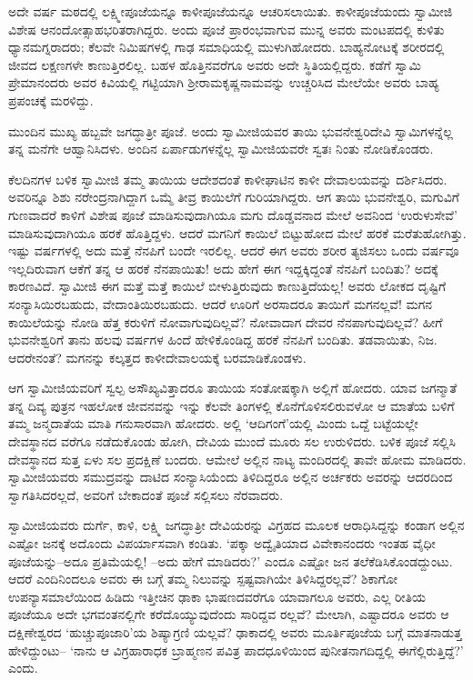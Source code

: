 ಅದೇ ವರ್ಷ ಮಠದಲ್ಲಿ ಲಕ್ಷ್ಮೀಪೂಜೆಯನ್ನೂ ಕಾಳೀಪೂಜೆಯನ್ನೂ ಆಚರಿಸಲಾಯಿತು. ಕಾಳೀಪೂಜೆಯಂದು ಸ್ವಾಮೀಜಿ ವಿಶೇಷ ಆನಂದೋತ್ಸಾಹಭರಿತರಾಗಿದ್ದರು. ಅಂದು ಪೂಜೆ ಪ್ರಾರಂಭವಾಗುವ ಮುನ್ನ ಅವರು ಮಂಟಪದಲ್ಲಿ ಕುಳಿತು ಧ್ಯಾನಮಗ್ನರಾದರು; ಕೆಲವೇ ನಿಮಿಷಗಳಲ್ಲಿ ಗಾಢ ಸಮಾಧಿಯಲ್ಲಿ ಮುಳುಗಿಹೋದರು. ಬಾಹ್ಯನೋಟಕ್ಕೆ ಶರೀರದಲ್ಲಿ ಜೀವದ ಲಕ್ಷಣಗಳೇ ಕಾಣುತ್ತಿರಲಿಲ್ಲ. ಬಹಳ ಹೊತ್ತಿನವರೆಗೂ ಅವರು ಅದೇ ಸ್ಥಿತಿಯಲ್ಲಿದ್ದರು. ಕಡೆಗೆ ಸ್ವಾಮಿ ಪ್ರೇಮಾನಂದರು ಅವರ ಕಿವಿಯಲ್ಲಿ ಗಟ್ಟಿಯಾಗಿ ಶ್ರೀರಾಮಕೃಷ್ಣನಾಮವನ್ನು ಉಚ್ಚರಿಸಿದ ಮೇಲೆಯೇ ಅವರು ಬಾಹ್ಯ ಪ್ರಪಂಚಕ್ಕೆ ಮರಳಿದ್ದು.

ಮುಂದಿನ ಮುಖ್ಯ ಹಬ್ಬವೇ ಜಗದ್ಧಾತ್ರೀ ಪೂಜೆ. ಅಂದು ಸ್ವಾಮೀಜಿಯವರ ತಾಯಿ ಭುವನೇಶ್ವರಿದೇವಿ ಸ್ವಾಮಿಗಳನ್ನೆಲ್ಲ ತನ್ನ ಮನೆಗೇ ಆಹ್ವಾನಿಸಿದಳು. ಅಂದಿನ ಏರ್ಪಾಡುಗಳನ್ನೆಲ್ಲ ಸ್ವಾಮೀಜಿಯವರೇ ಸ್ವತಃ ನಿಂತು ನೋಡಿಕೊಂಡರು.

ಕೆಲದಿನಗಳ ಬಳಿಕ ಸ್ವಾಮೀಜಿ ತಮ್ಮ ತಾಯಿಯ ಆದೇಶದಂತೆ ಕಾಳೀಘಾಟಿನ ಕಾಳೀ ದೇವಾಲಯವನ್ನು ದರ್ಶಿಸಿದರು. ಅವರಿನ್ನೂ ಶಿಶು ನರೇಂದ್ರನಾಗಿದ್ದಾಗ ಒಮ್ಮೆ ತೀವ್ರ ಕಾಯಿಲೆಗೆ ಗುರಿಯಾಗಿದ್ದರು. ಆಗ ತಾಯಿ ಭುವನೇಶ್ವರಿ, ಮಗುವಿಗೆ ಗುಣವಾದರೆ ಕಾಳಿಗೆ ವಿಶೇಷ ಪೂಜೆ ಮಾಡಿಸುವುದಾಗಿಯೂ ಮಗು ದೊಡ್ಡವನಾದ ಮೇಲೆ ಅವನಿಂದ ‘ಉರುಳುಸೇವೆ’ ಮಾಡಿಸುವುದಾಗಿಯೂ ಹರಕೆ ಹೊತ್ತಿದ್ದಳು. ಆದರೆ ಮಗನಿಗೆ ಕಾಯಿಲೆ ಬಿಟ್ಟುಹೋದ ಮೇಲೆ ಹರಕೆ ಮರೆತುಹೋಗಿತ್ತು. ಇಷ್ಟು ವರ್ಷಗಳಲ್ಲಿ ಅದು ಮತ್ತೆ ನೆನಪಿಗೆ ಬಂದೇ ಇರಲಿಲ್ಲ. ಆದರೆ ಈಗ ಅವರು ಶರೀರ ತ್ಯಜಿಸಲು ಒಂದು ವರ್ಷವೂ ಇಲ್ಲದಿರುವಾಗ ಆಕೆಗೆ ತನ್ನ ಆ ಹರಕೆ ನೆನಪಾಯಿತು! ಅದು ಹೇಗೆ ಈಗ ಇದ್ದಕ್ಕಿದ್ದಂತೆ ನೆನಪಿಗೆ ಬಂದಿತು? ಅದಕ್ಕೆ ಕಾರಣವಿದೆ. ಸ್ವಾಮೀಜಿ ಈಗ ಮತ್ತೆ ಮತ್ತೆ ಕಾಯಿಲೆ ಬೀಳುತ್ತಿರುವುದು ಕಾಣುತ್ತಿದೆಯಲ್ಲ! ಅವರು ಲೋಕದ ದೃಷ್ಟಿಗೆ ಸಂನ್ಯಾಸಿಯಿರಬಹುದು, ವೇದಾಂತಿಯಿರಬಹುದು. ಆದರೆ ಊರಿಗೆ ಅರಸಾದರೂ ತಾಯಿಗೆ ಮಗನಲ್ಲವೆ! ಮಗನ ಕಾಯಿಲೆಯನ್ನು ನೋಡಿ ಹೆತ್ತ ಕರುಳಿಗೆ ನೋವಾಗುವುದಿಲ್ಲವೆ? ನೋವಾದಾಗ ದೇವರ ನೆನಪಾಗುವುದಿಲ್ಲವೆ? ಹೀಗೆ ಭುವನೇಶ್ವರಿಗೆ ತಾನು ಹಲವು ವರ್ಷಗಳ ಹಿಂದೆ ಹೇಳಿಕೊಂಡಿದ್ದ ಹರಕೆ ನೆನಪಿಗೆ ಬಂದಿತು. ತಡವಾಯಿತು, ನಿಜ. ಆದರೇನಂತೆ? ಮಗನನ್ನು ಕಲ್ಕತ್ತದ ಕಾಳೀದೇವಾಲಯಕ್ಕೆ ಬರಮಾಡಿಕೊಂಡಳು.

ಆಗ ಸ್ವಾಮೀಜಿಯವರಿಗೆ ಸ್ವಲ್ಪ ಅಸೌಖ್ಯವಿತ್ತಾದರೂ ತಾಯಿಯ ಸಂತೋಷಕ್ಕಾಗಿ ಅಲ್ಲಿಗೆ ಹೋದರು. ಯಾವ ಜಗನ್ಮಾತೆ ತನ್ನ ದಿವ್ಯ ಪುತ್ರನ ಇಹಲೋಕ ಜೀವನವನ್ನು ಇನ್ನು ಕೆಲವೇ ತಿಂಗಳಲ್ಲಿ ಕೊನೆಗೊಳಿಸಲಿರುವಳೋ ಆ ಮಾತೆಯ ಬಳಿಗೆ ತಮ್ಮ ಜನ್ಮದಾತೆಯ ಮಾತಿ ಗನುಸಾರವಾಗಿ ಹೋದರು. ಅಲ್ಲಿ ‘ಆದಿಗಂಗೆ’ಯಲ್ಲಿ ಮಿಂದು ಒದ್ದೆ ಬಟ್ಟೆಯಲ್ಲೇ ದೇವಸ್ಥಾನದ ವರೆಗೂ ನಡೆದುಕೊಂಡು ಹೋಗಿ, ದೇವಿಯ ಮುಂದೆ ಮೂರು ಸಲ ಉರುಳಿದರು. ಬಳಿಕ ಪೂಜೆ ಸಲ್ಲಿಸಿ ದೇವಸ್ಥಾನದ ಸುತ್ತ ಏಳು ಸಲ ಪ್ರದಕ್ಷಿಣೆ ಬಂದರು. ಆಮೇಲೆ ಅಲ್ಲಿನ ನಾಟ್ಯ ಮಂದಿರದಲ್ಲಿ ತಾವೇ ಹೋಮ ಮಾಡಿದರು. ಸ್ವಾಮೀಜಿಯವರು ಸಮುದ್ರವನ್ನು ದಾಟಿದ ಸಂನ್ಯಾಸಿಯೆಂದು ತಿಳಿದಿದ್ದರೂ ಅಲ್ಲಿನ ಅರ್ಚಕರು ಅವರನ್ನು ಆದರದಿಂದ ಸ್ವಾಗತಿಸಿದರಲ್ಲದೆ, ಅವರಿಗೆ ಬೇಕಾದಂತೆ ಪೂಜೆ ಸಲ್ಲಿಸಲು ನೆರವಾದರು.

ಸ್ವಾಮೀಜಿಯವರು ದುರ್ಗೆ, ಕಾಳಿ, ಲಕ್ಷ್ಮಿ ಜಗದ್ಧಾತ್ರೀ ದೇವಿಯರನ್ನು ವಿಗ್ರಹದ ಮೂಲಕ ಆರಾಧಿಸಿದ್ದನ್ನು ಕಂಡಾಗ ಅಲ್ಲಿನ ಎಷ್ಟೋ ಜನಕ್ಕೆ ಅದೊಂದು ವಿಪರ್ಯಾಸವಾಗಿ ಕಂಡಿತು. ‘ಪಕ್ಕಾ ಅದ್ವೈತಿಯಾದ ವಿವೇಕಾನಂದರು ಇಂತಹ ವೈಧೀ ಪೂಜೆಯನ್ನು–ಅದೂ ಪ್ರತಿಮೆಯಲ್ಲಿ! –ಅದು ಹೇಗೆ ಮಾಡಿದರು?’ ಎಂದೂ ಎಷ್ಟೋ ಜನ ತಲೆಕೆಡಿಸಿಕೊಂಡದ್ದುಂಟು. ಆದರೆ ಎಂದಿನಿಂದಲೂ ಅವರು ಈ ಬಗ್ಗೆ ತಮ್ಮ ನಿಲುವನ್ನು ಸ್ಪಷ್ಟವಾಗಿಯೇ ತಿಳಿಸಿದ್ದರಲ್ಲವೆ? ಶಿಕಾಗೋ ಉಪನ್ಯಾಸಮಾಲೆಯಿಂದ ಹಿಡಿದು ಇತ್ತೀಚಿನ ಢಾಕಾ ಭಾಷಣದವರೆಗೂ ಯಾವಾಗಲೂ ಅವರು, ಎಲ್ಲ ರೀತಿಯ ಪೂಜೆಯೂ ಅದೇ ಭಗವಂತನಲ್ಲಿಗೇ ಕರೆದೊಯ್ಯುವುದೆಂದು ಸಾರಿದ್ದವ ರಲ್ಲವೆ? ಮೇಲಾಗಿ, ಎಷ್ಟಾದರೂ ಅವರು ಆ ದಕ್ಷಿಣೇಶ್ವರದ ‘ಹುಚ್ಚುಪೂಜಾರಿ’ಯ ಶಿಷ್ಯಾಗ್ರಣಿ ಯಲ್ಲವೆ? ಢಾಕಾದಲ್ಲಿ ಅವರು ಮೂರ್ತಿಪೂಜೆಯ ಬಗ್ಗೆ ಮಾತನಾಡುತ್ತ ಹೇಳಿದ್ದುಂಟು– ‘ನಾನು ಆ ವಿಗ್ರಹಾರಾಧಕ ಬ್ರಾಹ್ಮಣನ ಪವಿತ್ರ ಪಾದಧೂಳಿಯಿಂದ ಪುನೀತನಾಗದಿದ್ದಲ್ಲಿ ಈಗೆಲ್ಲಿರುತ್ತಿದ್ದೆ?’ ಎಂದು.

